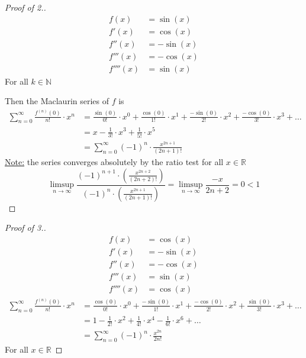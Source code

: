 \documentclass[12pt]{report}
\begin{document}
    \begin{proof}[Proof of \textnormal{2.}]
        \begin{align*}
            f(x) &= \sin(x)\\
            f'(x) &= \cos(x)\\
            f''(x) &= - \sin(x)\\
            f'''(x) &= - \cos(x)\\
            f''''(x) &= \sin(x)
        \end{align*}
        \sidebyside{\[f^{4k} (x) = \sin(x)\]}{\[f^{4k+1}(x) = \cos(x)\]}
        For all \(k \in \mathbb{N}\)

        Then the Maclaurin series of \(f\) is
        \begin{align*}
            \sum^\infty_{n=0} \frac{f^{(n)}(0)}{n!} \cdot x^n &= \frac{\sin(0)}{0!} \cdot x^0 + \frac{\cos(0)}{1!} \cdot x^1 + \frac{- \sin(0)}{2!} \cdot x^2 + \frac{- \cos(0)}{3!}\cdot x^3 + \dots\\
            &= x - \frac{1}{3!} \cdot x^3 + \frac{1}{5!} \cdot x^5\\
            &= \sum^\infty_{n=0} (-1)^n \cdot \frac{x^{2n+1}}{(2n+1)!}
        \end{align*}
        \underline{Note:} the series converges absolutely by the ratio test for all \(x \in \mathbb{R}\)
        \[\limsup_{n \to \infty} \frac{\left(-1\right)^{n+1}\cdot \left(\frac{x^{2n+2}}{\left(2n+2\right)!}\right)}{\left(-1\right)^n\cdot \left(\frac{x^{2n+1}}{\left(2n+1\right)!}\right)} = \limsup_{n \to \infty} \frac{-x}{2n+2} = 0 < 1\]
    \end{proof}
    \label{Maclaurin series 3}
    \begin{proof}[Proof of \textnormal{3.}]
        \begin{align*}
            f(x) &= \cos(x)\\
            f'(x) &= - \sin(x)\\
            f''(x) &= - \cos(x)\\
            f'''(x) &= \sin(x)\\
            f''''(x) &= \cos(x)
        \end{align*}
        \begin{align*}
            \sum^\infty_{n=0} \frac{f^{(n)}(0)}{n!} \cdot x^n &= \frac{\cos(0)}{0!} \cdot x^0 + \frac{- \sin(0)}{1!} \cdot x^1 + \frac{- \cos(0)}{2!} \cdot x^2 + \frac{\sin(0)}{3!}\cdot x^3 + \dots\\
            &= 1 - \frac{1}{2!} \cdot x^2 + \frac{1}{4!} \cdot x^4 - \frac{1}{6!} \cdot x^6 + \dots\\
            &= \sum^\infty_{n=0} (-1)^{n} \cdot \frac{x^{2n}}{2n!}
        \end{align*}
        For all \(x \in \mathbb{R}\)
    \end{proof}
\end{document}
